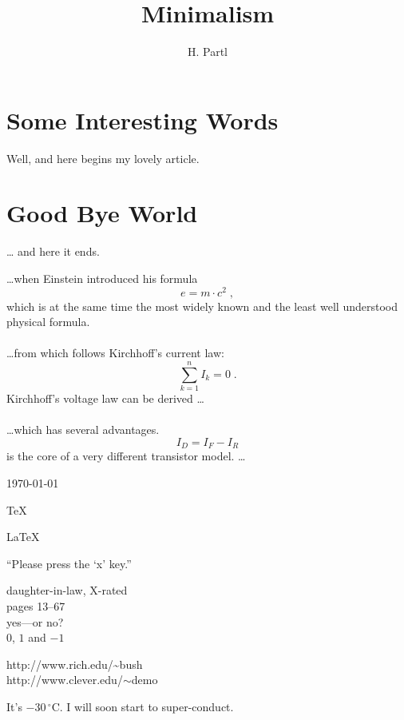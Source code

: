 \documentclass[a4paper,11pt]{book}
\author{H. Partl}
\title{Minimalism}
\begin{document}
	\maketitle
	\tableofcontents
	\section{Some Interesting Words}
	Well, and here begins my lovely article.
	\section{Good Bye World}
	\ldots{} and here it ends.
	
	\ldots when Einstein introduced his formula
	\begin{equation}
		e = m \cdot c^2 \; ,
	\end{equation}
	which is at the same time the most widely known
	and the least well understood physical formula.
	\\
	\\
	\ldots from which follows Kirchhoff’s current law:
	\begin{equation}
		\sum_{k=1}^{n} I_k = 0 \; .
	\end{equation}
	Kirchhoff’s voltage law can be derived \ldots
	\\
	\\
	\ldots which has several advantages.
	\begin{equation}
	I_D = I_F - I_R
	\end{equation}
	is the core of a very different transistor model. \ldots
	
	\today 
	
	\TeX
	
	\LaTeX
	
	\LaTeXe
	
	``Please press the `x' key.''
	
	daughter-in-law, X-rated\\
	
	pages 13--67\\
	
	yes---or no? \\
	
	$0$, $1$ and $-1$
	
	http://www.rich.edu/\~{}bush \\
	http://www.clever.edu/$\sim$demo
	
	It’s $-30\,^{\circ}\mathrm{C}$.
	I will soon start to
	super-conduct.
	
\end{document}
